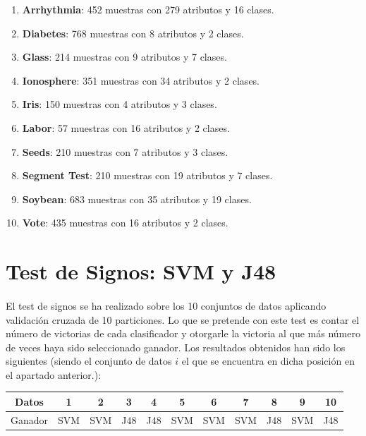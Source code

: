 \documentclass[10pt, a4paper,spanish]{article}
\begin{document}
			\begin{enumerate}
				\item \textbf{Arrhythmia}: 452 muestras con 279 atributos y 16 clases.
				\item \textbf{Diabetes}: 768 muestras con 8 atributos y 2 clases.
				\item \textbf{Glass}: 214 muestras con 9 atributos y 7 clases.
				\item \textbf{Ionosphere}: 351 muestras con 34 atributos y 2 clases.
				\item \textbf{Iris}: 150 muestras con 4 atributos y 3 clases.
				\item \textbf{Labor}: 57 muestras con 16 atributos y 2 clases.
				\item \textbf{Seeds}: 210 muestras con 7 atributos y 3 clases.
				\item \textbf{Segment Test}: 210 muestras con 19 atributos y 7 clases.
				\item \textbf{Soybean}: 683 muestras con 35 atributos y 19 clases.
				\item \textbf{Vote}: 435 muestras con 16 atributos y 2 clases.
			\end{enumerate}


	\section{Test de Signos: SVM y J48}

        \paragraph{}
		El test de signos se ha realizado sobre los 10 conjuntos de datos aplicando validación cruzada de 10 particiones. Lo que se pretende con este test es contar el número de victorias de cada clasificador y otorgarle la victoria al que más número de veces haya sido seleccionado ganador. Los resultados obtenidos han sido los siguientes (siendo el conjunto de datos $i$ el que se encuentra en dicha posición en el apartado anterior.):

		\hfill
		\begin{center}
			\begin{tabular}{ | c || c | c | c | c | c | c | c | c | c | c | }
				\hline
				Datos		& 1 	& 2		& 3 	& 4 	& 5 	& 6		& 7 	& 8 	& 9 	& 10 \\ \hline \hline
				Ganador		& SVM 	& SVM 	& J48 	& J48 	& SVM 	& SVM 	& SVM 	& J48 	& SVM 	& J48 \\
				\hline
			\end{tabular}
		\end{center}
\end{document}
